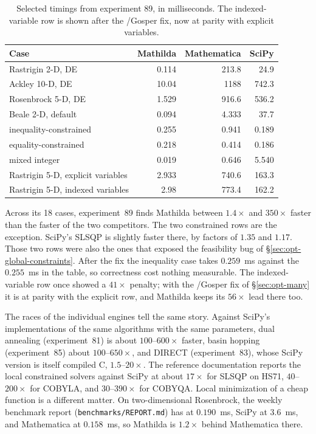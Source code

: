 \begin{table}[ht]
\centering
\small
\begin{tabular}{@{}lrrr@{}}
\toprule
Case & Mathilda & Mathematica & SciPy \\
\midrule
Rastrigin 2-D, DE & 0.114 & 213.8 & 24.9 \\
Ackley 10-D, DE & 10.04 & 1188 & 742.3 \\
Rosenbrock 5-D, DE & 1.529 & 916.6 & 536.2 \\
Beale 2-D, default & 0.094 & 4.333 & 37.7 \\
inequality-constrained & 0.255 & 0.941 & 0.189 \\
equality-constrained & 0.218 & 0.414 & 0.186 \\
mixed integer & 0.019 & 0.646 & 5.540 \\
Rastrigin 5-D, explicit variables & 2.933 & 740.6 & 163.3 \\
Rastrigin 5-D, indexed variables & 2.98 & 773.4 & 162.2 \\
\bottomrule
\end{tabular}
\caption{Selected timings from experiment 89, in milliseconds. The indexed-variable
row is shown after the /Gosper fix, now at parity with explicit variables.}
\label{tab:opt-bench}
\end{table}

Across its 18 cases, experiment~89 finds Mathilda between \(1.4\times\) and
\(350\times\) faster than the faster of the two competitors. The two
constrained rows are the exception. SciPy's SLSQP is slightly faster there, by
factors of \(1.35\) and \(1.17\). Those two rows were also the ones that
exposed the feasibility bug of \S\ref{sec:opt-global-constraints}. After the
fix the inequality case takes \(0.259\)~ms against the \(0.255\)~ms in the
table, so correctness cost nothing measurable. The indexed-variable row once
showed a \(41\times\) penalty; with the /Gosper fix of \S\ref{sec:opt-many}
it is at parity with the explicit row, and Mathilda keeps its \(56\times\) lead
there too.

The races of the individual engines tell the same story. Against SciPy's
implementations of the same algorithms with the same parameters, dual
annealing (experiment~81) is about \(100\)--\(600\times\) faster, basin hopping
(experiment~85) about \(100\)--\(650\times\), and DIRECT (experiment~83), whose
SciPy version is itself compiled C, \(1.5\)--\(20\times\). The reference
documentation reports the local constrained solvers against SciPy at about
\(17\times\) for SLSQP on HS71, \(40\)--\(200\times\) for COBYLA, and
\(30\)--\(390\times\) for COBYQA. Local minimization of a cheap function is a
different matter. On two-dimensional Rosenbrock, the weekly benchmark report
(\texttt{benchmarks/REPORT.md}) has  at \(0.190\)~ms, SciPy at
\(3.6\)~ms, and Mathematica at \(0.158\)~ms, so Mathilda is \(1.2\times\) behind
Mathematica there.

